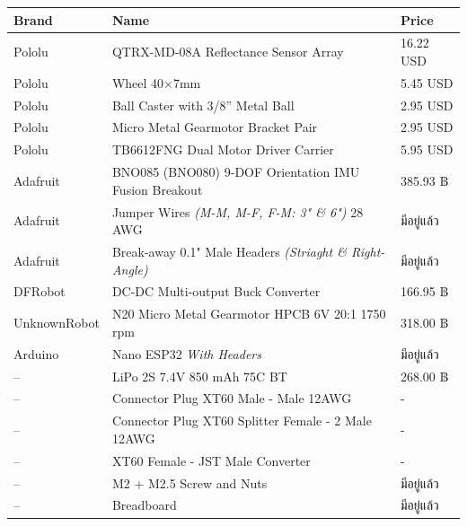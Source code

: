 \documentclass[14pt, fleqn, a4paper]{extarticle}
\begin{document}
\begin{table}[H]
\centering
\renewcommand{\arraystretch}{1.3}
\begin{tabularx}{\textwidth}{l X l}
\toprule
\textbf{Brand} & \textbf{Name} & \textbf{Price} \\ \midrule

Pololu & QTRX-MD-08A Reflectance Sensor Array 
	   & 16.22 USD \\

Pololu & Wheel 40×7mm 
	   & 5.45 USD \\

Pololu & Ball Caster with 3/8'' Metal Ball 
	   & 2.95 USD \\

Pololu & Micro Metal Gearmotor Bracket Pair 
	   & 2.95 USD \\

Pololu & TB6612FNG Dual Motor Driver Carrier 
	   & 5.95 USD \\

Adafruit & BNO085 (BNO080) 9-DOF Orientation IMU Fusion Breakout
		& 385.93 ฿ \\

Adafruit & Jumper Wires \textit{(M-M, M-F, F-M: 3" \& 6")} 28 AWG
		& มีอยู่แล้ว \\

Adafruit & Break-away 0.1" Male Headers \textit{(Striaght \& Right-Angle)}
		& มีอยู่แล้ว \\

DFRobot & DC-DC Multi-output Buck Converter
		& 166.95 ฿ \\

UnknownRobot & N20 Micro Metal Gearmotor HPCB 6V 20:1 1750 rpm 
			  & 318.00 ฿ \\

Arduino & Nano ESP32 \textit{With Headers} 
	& มีอยู่แล้ว \\

-- & LiPo 2S 7.4V 850 mAh 75C BT 
   & 268.00 ฿ \\

-- & Connector Plug XT60 Male - Male 12AWG
	& - \\

-- & Connector Plug XT60 Splitter Female - 2 Male 12AWG
	& - \\

-- & XT60 Female - JST Male Converter
	& - \\

-- & M2 + M2.5 Screw and Nuts 
   & มีอยู่แล้ว \\

-- & Breadboard 
   & มีอยู่แล้ว \\

\bottomrule
\end{tabularx}
\end{table}
\end{document}
